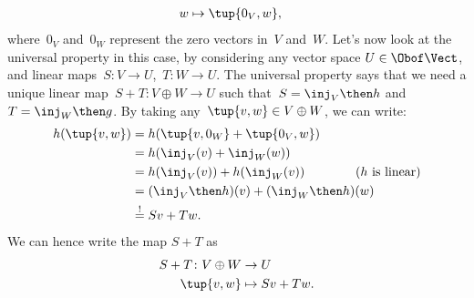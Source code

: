 {\begin{example}
\begin{equation*}
\begin{aligned}
                w               & \mapsto \tup{0_V,w},
            \end{aligned}
        \end{equation*}
        where~$0_V$ and~$0_W$ represent the zero vectors in~$V$ and~$W$.
        Let's now look at the universal property in this case, by considering any vector space $U\in \Obof\Vect$, and linear maps~$S\colon V\to U$,~$T\colon W\to U$.
        The universal property says that we need a unique linear map~$S+T\colon V\oplus W \to U$ such that~$S=\inj_V\then h$ and~$T=\inj_W\then g$.
        By taking any~$\tup{v,w}\in V\oplus W$, we can write:
        \begin{equation*}
            \begin{aligned}
                h(\tup{v,w}) & =h(\tup{v,0_W}+\tup{0_V,w})                                    \\
                             & =h(\inj_V(v)+\inj_W(w))                                        \\
                             & =h(\inj_V(v))+h(\inj_W(v)) \qquad \qquad (h \text{ is linear}) \\
                             & =(\inj_V\then h)(v)+(\inj_W\then h)(w)                         \\
                             & \overset{!
                }{=}
                Sv+Tw.
            \end{aligned}
        \end{equation*}
        We can hence write the map $S+T$ as
        \begin{equation*}
            \begin{aligned}
                S+T\colon V\oplus W & \to U          \\
                \tup{v,w}           & \mapsto Sv+Tw.
            \end{aligned}
        \end{equation*}
    \end{example}
}
